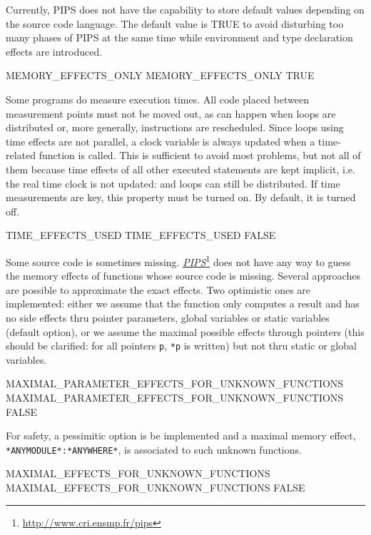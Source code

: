 \documentclass[a4paper]{report}
\newcommand{\LINK}[2]{\href{#2}{#1}\footnote{\url{#2}}\xspace}
\newcommand{\PIPS}{\LINK{\emph{PIPS}}{http://www.cri.ensmp.fr/pips}}
\begin{document}
Currently, PIPS does not have the capability to store default values
depending on the source code language. The default value is TRUE to
avoid disturbing too many phases of PIPS at the same time while
environment and type declaration effects are introduced.

\begin{PipsProp}{MEMORY_EFFECTS_ONLY}
MEMORY_EFFECTS_ONLY TRUE
\end{PipsProp}

Some programs do measure execution times. All code placed between
measurement points must not be moved out, as can happen when loops are
distributed or, more generally, instructions are rescheduled. Since
loops using time effects are not parallel, a clock variable is always
updated when a time-related function is called. This is sufficient to
avoid most problems, but not all of them because time effects of all
other executed statements are kept implicit, i.e. the real time clock
is not updated: and loops can still be distributed. If time
measurements are key, this property must be turned on. By default, it
is turned off.

\begin{PipsProp}{TIME_EFFECTS_USED}
TIME_EFFECTS_USED FALSE
\end{PipsProp}

Some source code is sometimes missing. \PIPS does not have any way to
guess the memory effects of functions whose source code is
missing. Several approaches are possible to approximate the exact
effects. Two optimistic ones are implemented: either we assume that
the function only computes a result and has no side effects thru
pointer parameters, global variables or static variables (default
option), or we assume the maximal possible effects through pointers
(this should be clarified: for all pointers \verb/p/, \verb/*p/ is
written) but not thru static or global variables.

\begin{PipsProp}{MAXIMAL_PARAMETER_EFFECTS_FOR_UNKNOWN_FUNCTIONS}
MAXIMAL_PARAMETER_EFFECTS_FOR_UNKNOWN_FUNCTIONS FALSE
\end{PipsProp}

For safety, a pessimitic option is be implemented and a maximal memory
effect, \verb/*ANYMODULE*:*ANYWHERE*/, is associated to such unknown
functions.

\begin{PipsProp}{MAXIMAL_EFFECTS_FOR_UNKNOWN_FUNCTIONS}
MAXIMAL_EFFECTS_FOR_UNKNOWN_FUNCTIONS FALSE
\end{PipsProp}
\end{document}
